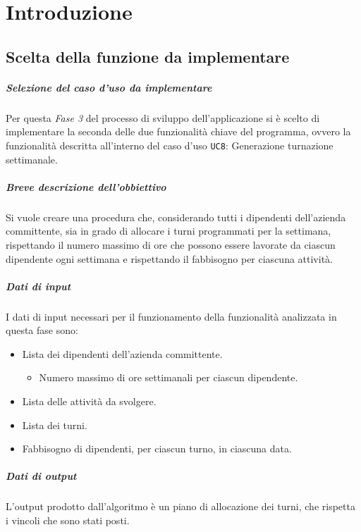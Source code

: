 \chapter{Introduzione}
\section{Scelta della funzione da implementare}
\paragraph{Selezione del caso d'uso da implementare}
Per questa \textit{Fase 3} del processo di sviluppo dell'applicazione si è scelto di implementare la seconda delle due funzionalità chiave del programma, ovvero la funzionalità descritta all'interno del caso d'uso \verb|UC8|: Generazione turnazione settimanale.

\paragraph{Breve descrizione dell'obbiettivo}
Si vuole creare una procedura che, considerando tutti i dipendenti dell'azienda committente, sia in grado di allocare i turni programmati per la settimana, rispettando il numero massimo di ore che possono essere lavorate da ciascun dipendente ogni settimana e rispettando il fabbisogno per ciascuna attività.

\paragraph{Dati di input}
I dati di input necessari per il funzionamento della funzionalità analizzata in questa fase sono:
\begin{itemize}
	\item Lista dei dipendenti dell'azienda committente.
		\begin{itemize}
			\item Numero massimo di ore settimanali per ciascun dipendente.
		\end{itemize}
	\item Lista delle attività da svolgere.
	\item Lista dei turni.
	\item Fabbisogno di dipendenti, per ciascun turno, in ciascuna data.
\end{itemize}

\paragraph{Dati di output}
L'output prodotto dall'algoritmo è un piano di allocazione dei turni, che rispetta i vincoli che sono stati posti.
